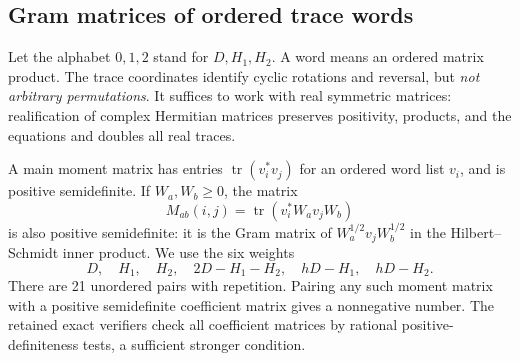 \documentclass[11pt]{article}
\newcommand{\tr}{\operatorname{tr}}
\theoremstyle{remark}\newtheorem{remark}[theorem]{Remark}
\begin{document}
\subsection{Gram matrices of ordered trace words}
Let the alphabet \(0,1,2\) stand for \(D,H_1,H_2\). A word means an ordered matrix product. The trace coordinates identify cyclic rotations and reversal, but \emph{not arbitrary permutations}. It suffices to work with real symmetric matrices: realification of complex Hermitian matrices preserves positivity, products, and the equations and doubles all real traces.

A main moment matrix has entries \(\tr(v_i^*v_j)\) for an ordered word list \(v_i\), and is positive semidefinite. If \(W_a,W_b\ge0\), the matrix
\begin{equation}\label{eq:localgram}
 M_{ab}(i,j)=\tr(v_i^*W_av_jW_b)
\end{equation}
is also positive semidefinite: it is the Gram matrix of \(W_a^{1/2}v_jW_b^{1/2}\) in the Hilbert--Schmidt inner product. We use the six weights
\[
 D,\quad H_1,\quad H_2,\quad 2D-H_1-H_2,\quad hD-H_1,\quad hD-H_2.
\]
There are 21 unordered pairs with repetition. Pairing any such moment matrix with a positive semidefinite coefficient matrix gives a nonnegative number. The retained exact verifiers check all coefficient matrices by rational positive-definiteness tests, a sufficient stronger condition.
\end{document}
